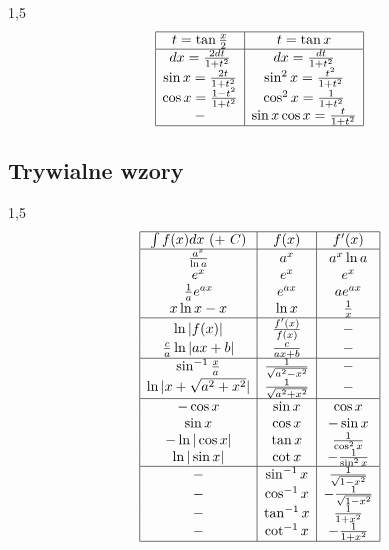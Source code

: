 \documentclass[11pt]{article}
\begin{document}
\begin{spacing}{1,5}
\[
\begin{array}{|c|c|c|}
	\hline
	t = \tan \frac{x}{2} & t = \tan x \\
	\hline
	dx = \frac{2dt}{1 + t^2} & dx = \frac{dt}{1 + t^2} \\
	\sin x = \frac{2t}{1 + t^2} & \sin^2 x = \frac{t^2}{1 + t^2} \\
	\cos x = \frac{1 - t^2}{1 + t^2} & \cos^2 x = \frac{1}{1 + t^2} \\
	- & \sin x \cos x = \frac{t}{1 + t^2} \\
	\hline
\end{array}
\]
\end{spacing}

\subsection{Trywialne wzory}

\begin{spacing}{1,5} \[ \begin{array}{|c|c|c|}
	\hline
		\int f(x) dx\ (+\ C) & f(x) & f'(x) \\
	\hline
		\frac{a^x}{\ln a} & a^x & a^x \ln a \\
		e^x & e^x & e^x \\
		\frac{1}{a} e^{ax} & e^{ax} & ae^{ax} \\
		x \ln x - x & \ln x & \frac{1}{x} \\
	\hline
		\ln|f(x)| & \frac{f'(x)}{f(x)} & - \\
		\frac{c}{a} \ln|ax + b| & \frac{c}{ax +b} & - \\
	\hline
		\sin^{-1} \frac{x}{a} & \frac{1}{\sqrt{a^2 - x^2}} & - \\
		\ln|x + \sqrt{a^2 + x^2}| & \frac{1}{\sqrt{a^2 + x^2}} & - \\
	\hline
		-\cos x		& \sin x	&  \cos x \\
		 \sin x		& \cos x	& -\sin x \\
		-\ln|\cos x|	& \tan x	&  \frac{1}{\cos^2 x} \\
		 \ln|\sin x|	& \cot x	& -\frac{1}{\sin^2 x} \\
	\hline
		 -	& \sin^{-1} x	&  \frac{1}{\sqrt{1-x^2}} \\
		 -	& \cos^{-1} x	& -\frac{1}{\sqrt{1-x^2}} \\
		 -	& \tan^{-1} x	& \frac{1}{1+x^2} \\
		 -	& \cot^{-1} x	& -\frac{1}{1+x^2} \\
	\hline
\end{array} \] \end{spacing}
\end{document}
